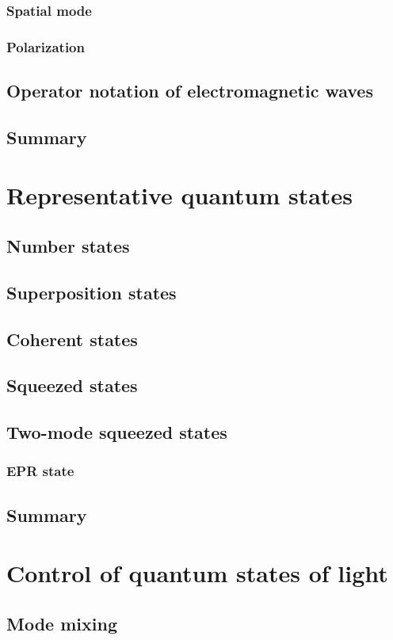 \documentclass{book}
\begin{document}
\subsection{Spatial mode}
\subsection{Polarization}
\section{Operator notation of electromagnetic waves}
\section{Summary}

\chapter{Representative quantum states}
\section{Number states}
\section{Superposition states}
\section{Coherent states}
\section{Squeezed states}
\section{Two-mode squeezed states}
\subsection{EPR state}
\section{Summary}

\chapter{Control of quantum states of light}
\section{Mode mixing}
\end{document}
